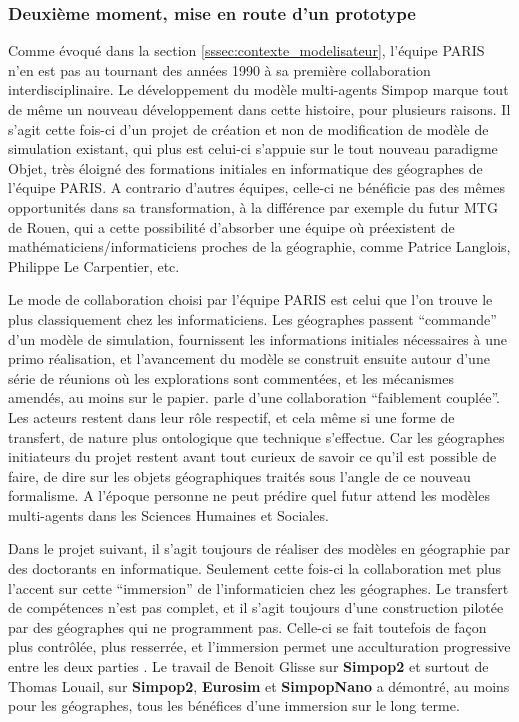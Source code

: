 \subsubsection{Deuxième moment, mise en route d'un prototype}
\label{sssec:deuxieme_moment}

Comme évoqué dans la section \ref{sssec:contexte_modelisateur}, l'équipe PARIS n'en est pas au tournant des années 1990 à sa première collaboration interdisciplinaire. Le développement du modèle multi-agents Simpop \autocites{GuerinPace1993, Bura1995} marque tout de même un nouveau développement dans cette histoire, pour plusieurs raisons. Il s'agit cette fois-ci d'un projet de création et non de modification de modèle de simulation existant, qui plus est celui-ci s'appuie sur le tout nouveau paradigme Objet, très éloigné des formations initiales en informatique des géographes de l'équipe PARIS. A contrario d'autres équipes, celle-ci ne bénéficie pas des mêmes opportunités dans sa transformation, à la différence par exemple du futur MTG de Rouen, qui a cette possibilité d'absorber une équipe où préexistent de mathématiciens/informaticiens proches de la géographie, comme Patrice Langlois, Philippe Le Carpentier, etc.

Le mode de collaboration choisi par l'équipe PARIS est celui que l'on trouve le plus classiquement chez les informaticiens. Les géographes passent \enquote{commande} d'un modèle de simulation, fournissent les informations initiales nécessaires à une primo réalisation, et l'avancement du modèle se construit ensuite autour d'une série de réunions où les explorations sont commentées, et les mécanismes amendés, au moins sur le papier. \textcite[10]{Louail2010} parle d'une collaboration \enquote{faiblement couplée}. Les acteurs restent dans leur rôle respectif, et cela même si une forme de transfert, de nature plus ontologique que technique s'effectue. Car les géographes initiateurs du projet restent avant tout curieux de savoir ce qu'il est possible de faire, de dire sur les objets géographiques traités sous l'angle de ce nouveau formalisme. A l'époque personne ne peut prédire quel futur attend les modèles multi-agents dans les Sciences Humaines et Sociales.

Dans le projet suivant, il s'agit toujours de réaliser des modèles en géographie par des doctorants en informatique. Seulement cette fois-ci la collaboration met plus l'accent sur cette \enquote{immersion} de l'informaticien chez les géographes. Le transfert de compétences n'est pas complet, et il s'agit toujours d'une construction pilotée par des géographes qui ne programment pas. Celle-ci se fait toutefois de façon plus contrôlée, plus resserrée, et l'immersion permet une acculturation progressive entre les deux parties \autocite[11]{Louail2010}. Le travail de Benoit Glisse sur \textbf{Simpop2} et surtout de Thomas Louail, sur \textbf{Simpop2}, \textbf{Eurosim} et \textbf{SimpopNano} a démontré, au moins pour les géographes, tous les bénéfices d'une immersion sur le long terme.

